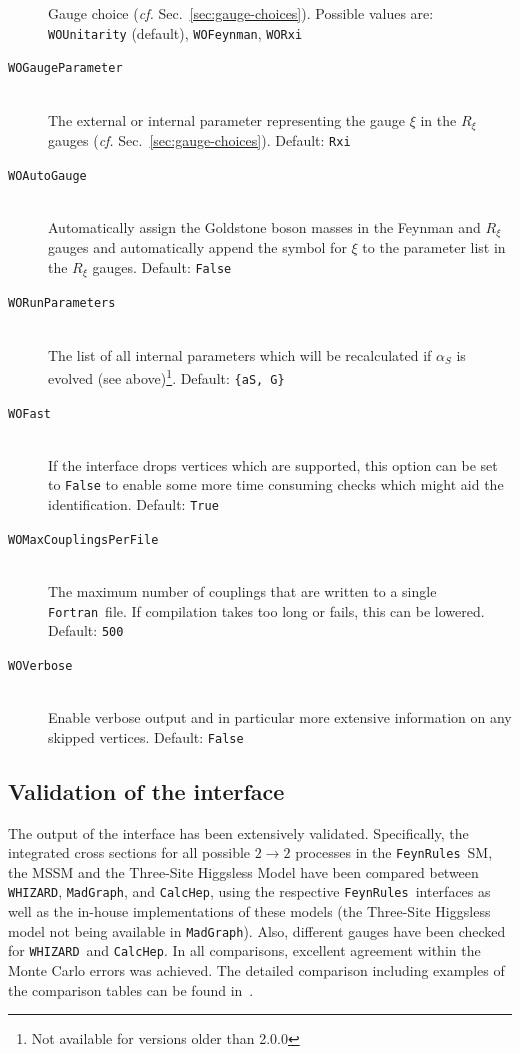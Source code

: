 \documentclass[12pt]{book}
\newcommand{\ttt}[1]{\texttt{#1}}
\newcommand{\whizard}{\ttt{WHIZARD}}
\newcommand{\madgraph}{\ttt{MadGraph}}
\newcommand{\CalcHep}{\ttt{CalcHep}}
\newcommand{\FeynRules}{\ttt{FeynRules}}
\newcommand{\fortran}{\ttt{Fortran}}
\begin{document}
\begin{description}
Gauge choice (\emph{cf.} Sec.~\ref{sec:gauge-choices}).
Possible values are: \ttt{WOUnitarity} (default),
\ttt{WOFeynman}, \ttt{WORxi}
%
\item[\ttt{WOGaugeParameter}]\mbox{}\\
The external or internal parameter representing the gauge $\xi$ in
the $R_\xi$ gauges (\emph{cf.} Sec.~\ref{sec:gauge-choices}). Default:
\ttt{Rxi}
%
\item[\ttt{WOAutoGauge}]\mbox{}\\
Automatically assign the Goldstone boson masses in the Feynman and $R_\xi$
gauges and automatically append the symbol for $\xi$ to the parameter list in
the $R_\xi$ gauges. Default: \ttt{False}
%
\item[\ttt{WORunParameters}]\mbox{}\\
The list of all internal parameters which will be recalculated if $\alpha_S$ is
evolved (see above)\footnote{Not available for versions older than
  2.0.0}. Default: \mbox{\ttt{\{aS, G\}}}
%
\item[\ttt{WOFast}]\mbox{}\\
If the interface drops vertices which are supported, this option can be
set to \ttt{False} to enable some more time consuming checks which might aid
the identification. Default: \ttt{True}
%
\item[\ttt{WOMaxCouplingsPerFile}]\mbox{}\\
The maximum number of couplings that are written to a single \fortran\
file. If compilation takes too long or fails, this can be
lowered. Default: \ttt{500}
%
\item[\ttt{WOVerbose}]\mbox{}\\
Enable verbose output and in particular more extensive information on any
skipped vertices. Default: \ttt{False}
\end{description}


\subsection{Validation of the interface}

The output of the interface has been extensively
validated. Specifically, the integrated cross sections for all
possible $2\rightarrow 2$ processes in the \FeynRules\ SM, the MSSM
and the Three-Site Higgsless Model have been compared between
\whizard, \madgraph, and \CalcHep, using the respective \FeynRules\
interfaces as well as the in-house implementations of these models
(the Three-Site Higgsless model not being available in \madgraph).
Also, different gauges have been checked for \whizard\ and \CalcHep.
In all comparisons, excellent agreement within the Monte Carlo errors
was achieved. The detailed comparison including examples of the
comparison tables can be found in~\cite{Christensen:2010wz}.
\end{document}
